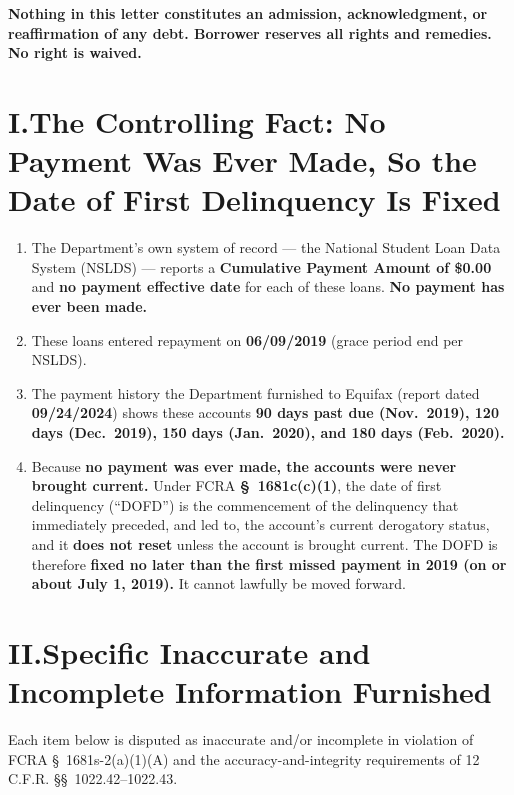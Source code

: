 \documentclass[11pt]{article}
\begin{document}
\vspace{0.5em}
\noindent \textbf{Nothing in this letter constitutes an admission, acknowledgment, or reaffirmation of any debt. Borrower reserves all rights and remedies. No right is waived.}

\section*{I.\quad The Controlling Fact: No Payment Was Ever Made, So the Date of First Delinquency Is Fixed}

\begin{enumerate}
  \item The Department's own system of record --- the National Student Loan Data System (NSLDS) --- reports a \textbf{Cumulative Payment Amount of \$0.00} and \textbf{no payment effective date} for each of these loans. \textbf{No payment has ever been made.}
  \item These loans entered repayment on \textbf{06/09/2019} (grace period end per NSLDS).
  \item The payment history the Department furnished to Equifax (report dated \textbf{09/24/2024}) shows these accounts \textbf{90 days past due (Nov.\ 2019), 120 days (Dec.\ 2019), 150 days (Jan.\ 2020), and 180 days (Feb.\ 2020).}
  \item Because \textbf{no payment was ever made, the accounts were never brought current.} Under FCRA \textbf{\S~1681c(c)(1)}, the date of first delinquency (``DOFD'') is the commencement of the delinquency that immediately preceded, and led to, the account's current derogatory status, and it \textbf{does not reset} unless the account is brought current. The DOFD is therefore \textbf{fixed no later than the first missed payment in 2019 (on or about July 1, 2019).} It cannot lawfully be moved forward.
\end{enumerate}

\section*{II.\quad Specific Inaccurate and Incomplete Information Furnished}

Each item below is disputed as inaccurate and/or incomplete in violation of FCRA \S~1681s-2(a)(1)(A) and the accuracy-and-integrity requirements of 12 C.F.R. \S\S~1022.42--1022.43.
\end{document}
